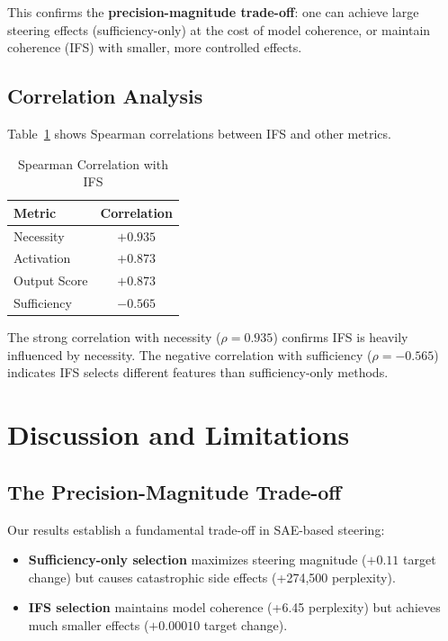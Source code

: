 \documentclass{article}
\begin{document}
This confirms the \textbf{precision-magnitude trade-off}: one can achieve large steering effects (sufficiency-only) at the cost of model coherence, or maintain coherence (IFS) with smaller, more controlled effects.

\subsection{Correlation Analysis}

Table~\ref{tab:correlation} shows Spearman correlations between IFS and other metrics.

\begin{table}[h]
\caption{Spearman Correlation with IFS}
\label{tab:correlation}
\centering
\begin{tabular}{lc}
\toprule
Metric & Correlation \\
\midrule
Necessity & $+0.935$ \\
Activation & $+0.873$ \\
Output Score & $+0.873$ \\
Sufficiency & $-0.565$ \\
\bottomrule
\end{tabular}
\end{table}

The strong correlation with necessity ($\rho = 0.935$) confirms IFS is heavily influenced by necessity. The negative correlation with sufficiency ($\rho = -0.565$) indicates IFS selects different features than sufficiency-only methods.

\section{Discussion and Limitations}
\label{sec:discussion}

\subsection{The Precision-Magnitude Trade-off}

Our results establish a fundamental trade-off in SAE-based steering:

\begin{itemize}
    \item \textbf{Sufficiency-only selection} maximizes steering magnitude ($+0.11$ target change) but causes catastrophic side effects (+274,500 perplexity).
    \item \textbf{IFS selection} maintains model coherence (+6.45 perplexity) but achieves much smaller effects ($+0.00010$ target change).
\end{itemize}
\end{document}
